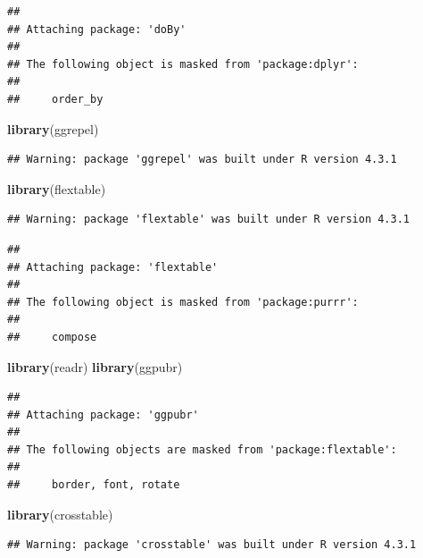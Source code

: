 \documentclass[
]{article}
\newenvironment{Shaded}{\begin{snugshade}}{\end{snugshade}}
\newcommand{\FunctionTok}[1]{\textcolor[rgb]{0.13,0.29,0.53}{\textbf{#1}}}
\newcommand{\NormalTok}[1]{#1}
\begin{document}
\begin{verbatim}
## 
## Attaching package: 'doBy'
## 
## The following object is masked from 'package:dplyr':
## 
##     order_by
\end{verbatim}

\begin{Shaded}
\begin{Highlighting}[]
\FunctionTok{library}\NormalTok{(ggrepel)}
\end{Highlighting}
\end{Shaded}

\begin{verbatim}
## Warning: package 'ggrepel' was built under R version 4.3.1
\end{verbatim}

\begin{Shaded}
\begin{Highlighting}[]
\FunctionTok{library}\NormalTok{(flextable)}
\end{Highlighting}
\end{Shaded}

\begin{verbatim}
## Warning: package 'flextable' was built under R version 4.3.1
\end{verbatim}

\begin{verbatim}
## 
## Attaching package: 'flextable'
## 
## The following object is masked from 'package:purrr':
## 
##     compose
\end{verbatim}

\begin{Shaded}
\begin{Highlighting}[]
\FunctionTok{library}\NormalTok{(readr)}
\FunctionTok{library}\NormalTok{(ggpubr)}
\end{Highlighting}
\end{Shaded}

\begin{verbatim}
## 
## Attaching package: 'ggpubr'
## 
## The following objects are masked from 'package:flextable':
## 
##     border, font, rotate
\end{verbatim}

\begin{Shaded}
\begin{Highlighting}[]
\FunctionTok{library}\NormalTok{(crosstable)}
\end{Highlighting}
\end{Shaded}

\begin{verbatim}
## Warning: package 'crosstable' was built under R version 4.3.1
\end{verbatim}
\end{document}
